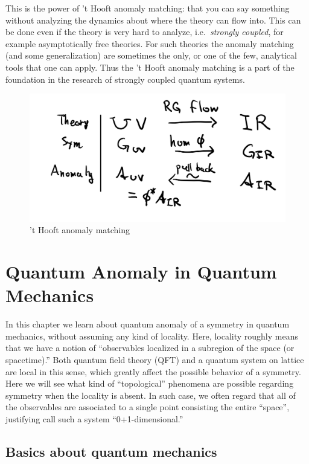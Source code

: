 \documentclass[
]{scrartcl}
\numberwithin{equation}{section}
\theoremstyle{definition}
\theoremstyle{definition}
\theoremstyle{definition}
\theoremstyle{definition}
\theoremstyle{remark}
\begin{document}
This is the power of 't Hooft anomaly matching: that you can say something without analyzing the dynamics about where the theory can flow into.
This can be done even if the theory is very hard to analyze, i.e.~\emph{strongly coupled}, for example asymptotically free theories.
For such theories the anomaly matching (and some generalization) are sometimes the only, or one of the few, analytical tools that one can apply.
Thus the 't Hooft anomaly matching is a part of the foundation in the research of strongly coupled quantum systems.

\begin{figure}

{\centering \includegraphics[width=0.5\linewidth]{figs/flow_symmetry} 

}

\caption{'t Hooft anomaly matching}\label{fig:flow}
\end{figure}

\hypertarget{quantum-anomaly-in-quantum-mechanics}{%
\section{Quantum Anomaly in Quantum Mechanics}\label{quantum-anomaly-in-quantum-mechanics}}

In this chapter we learn about quantum anomaly of a symmetry in quantum mechanics, without assuming any kind of locality.
Here, locality roughly means that we have a notion of ``observables localized in a subregion of the space (or spacetime).''
Both quantum field theory (QFT) and a quantum system on lattice are local in this sense, which greatly affect the possible behavior of a symmetry.
Here we will see what kind of ``topological'' phenomena are possible regarding symmetry when the locality is absent.
In such case, we often regard that all of the observables are associated to a single point consisting the entire ``space'', justifying call such a system ``0+1-dimensional.''

\hypertarget{basics-about-quantum-mechanics}{%
\subsection{Basics about quantum mechanics}\label{basics-about-quantum-mechanics}}
\end{document}
